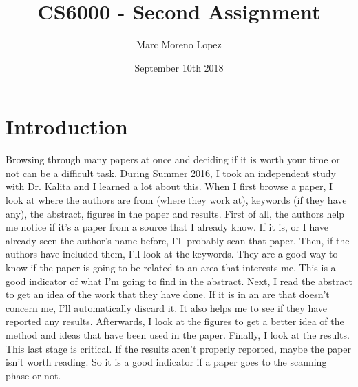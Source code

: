 \documentclass{article}
\title{CS6000 - Second Assignment}
\author{Marc Moreno Lopez}
\date{September 10th 2018}
\begin{document}
\maketitle

\section{Introduction}















Browsing through many papers at once and deciding if it is worth your time or not can be a difficult task. During Summer 2016, I took an independent study with Dr. Kalita and I learned a lot about this. When I first browse a paper, I look at where the authors are from (where they work at), keywords (if they have any), the abstract, figures in the paper and results. First of all, the authors help me notice if it's a paper from a source that I already know. If it is, or I have already seen the author's name before, I'll probably scan that paper. Then, if the authors have included them, I'll look at the keywords. They are a good way to know if the paper is going to be related to an area that interests me. This is a good indicator of what I'm going to find in the abstract. Next, I read the abstract to get an idea of the work that they have done. If it is in an are that doesn't concern me, I'll automatically discard it. It also helps me to see if they have reported any results. Afterwards, I look at the figures to get a better idea of the method and ideas that have been used in the paper. Finally, I look at the results. This last stage is critical. If the results aren't properly reported, maybe the paper isn't worth reading. So it is a good indicator if a paper goes to the scanning phase or not. 
\end{document}
